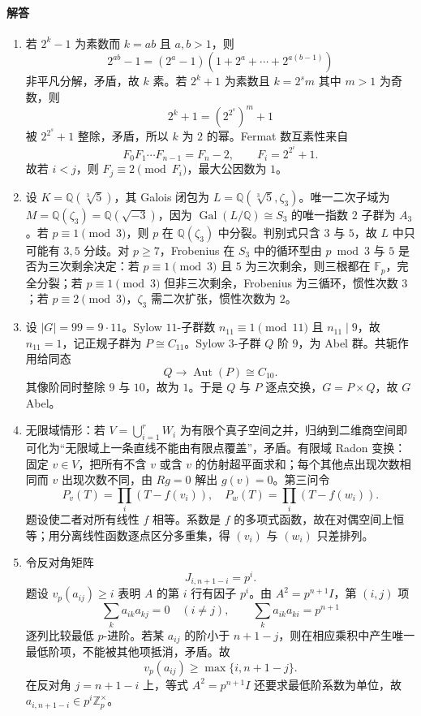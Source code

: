 \documentclass[UTF8,12pt]{ctexart}
\begin{document}
\paragraph{解答}
\begin{enumerate}[label=\textbf{\arabic*.},leftmargin=2.2em]
\item 若 \(2^k-1\) 为素数而 \(k=ab\) 且 \(a,b>1\)，则
\[
2^{ab}-1=(2^a-1)(1+2^a+\cdots+2^{a(b-1)})
\]
非平凡分解，矛盾，故 \(k\) 素。若 \(2^k+1\) 为素数且 \(k=2^s m\) 其中 \(m>1\) 为奇数，则
\[
2^k+1=(2^{2^s})^m+1
\]
被 \(2^{2^s}+1\) 整除，矛盾，所以 \(k\) 为 \(2\) 的幂。Fermat 数互素性来自
\[
F_0F_1\cdots F_{n-1}=F_n-2,\qquad F_i=2^{2^i}+1.
\]
故若 \(i<j\)，则 \(F_j\equiv2\pmod {F_i}\)，最大公因数为 \(1\)。
\item 设 \(K=\mathbb Q(\sqrt[3]{5})\)，其 Galois 闭包为 \(L=\mathbb Q(\sqrt[3]{5},\zeta_3)\)。唯一二次子域为 \(M=\mathbb Q(\zeta_3)=\mathbb Q(\sqrt{-3})\)，因为 \(\operatorname{Gal}(L/\mathbb Q)\cong S_3\) 的唯一指数 \(2\) 子群为 \(A_3\)。若 \(p\equiv1\pmod3\)，则 \(p\) 在 \(\mathbb Q(\zeta_3)\) 中分裂。判别式只含 \(3\) 与 \(5\)，故 \(L\) 中只可能有 \(3,5\) 分歧。对 \(p\ge7\)，Frobenius 在 \(S_3\) 中的循环型由 \(p\bmod3\) 与 \(5\) 是否为三次剩余决定：若 \(p\equiv1\pmod3\) 且 \(5\) 为三次剩余，则三根都在 \(\mathbb F_p\)，完全分裂；若 \(p\equiv1\pmod3\) 但非三次剩余，Frobenius 为三循环，惯性次数 \(3\)；若 \(p\equiv2\pmod3\)，\(\zeta_3\) 需二次扩张，惯性次数为 \(2\)。
\item 设 \(|G|=99=9\cdot 11\)。Sylow \(11\)-子群数 \(n_{11}\equiv1\pmod{11}\) 且 \(n_{11}\mid9\)，故 \(n_{11}=1\)，记正规子群为 \(P\cong C_{11}\)。Sylow \(3\)-子群 \(Q\) 阶 \(9\)，为 Abel 群。共轭作用给同态
\[
Q\to \operatorname{Aut}(P)\cong C_{10}.
\]
其像阶同时整除 \(9\) 与 \(10\)，故为 \(1\)。于是 \(Q\) 与 \(P\) 逐点交换，\(G=P\times Q\)，故 \(G\) Abel。
\item 无限域情形：若 \(V=\bigcup_{i=1}^r W_i\) 为有限个真子空间之并，归纳到二维商空间即可化为“无限域上一条直线不能由有限点覆盖”，矛盾。有限域 Radon 变换：固定 \(v\in V\)，把所有不含 \(v\) 或含 \(v\) 的仿射超平面求和；每个其他点出现次数相同而 \(v\) 出现次数不同，由 \(Rg=0\) 解出 \(g(v)=0\)。第三问令
\[
P_v(T)=\prod_i(T-f(v_i)),\quad P_w(T)=\prod_i(T-f(w_i)).
\]
题设使二者对所有线性 \(f\) 相等。系数是 \(f\) 的多项式函数，故在对偶空间上恒等；用分离线性函数逐点区分多重集，得 \((v_i)\) 与 \((w_i)\) 只差排列。
\item 令反对角矩阵
\[
J_{i,n+1-i}=p^i .
\]
题设 \(v_p(a_{ij})\ge i\) 表明 \(A\) 的第 \(i\) 行有因子 \(p^i\)。由 \(A^2=p^{n+1}I\)，第 \((i,j)\) 项
\[
\sum_k a_{ik}a_{kj}=0\quad(i\ne j),\qquad \sum_k a_{ik}a_{ki}=p^{n+1}
\]
逐列比较最低 \(p\)-进阶。若某 \(a_{ij}\) 的阶小于 \(n+1-j\)，则在相应乘积中产生唯一最低阶项，不能被其他项抵消，矛盾。故
\[
v_p(a_{ij})\ge\max\{i,n+1-j\}.
\]
在反对角 \(j=n+1-i\) 上，等式 \(A^2=p^{n+1}I\) 还要求最低阶系数为单位，故 \(a_{i,n+1-i}\in p^i\mathbb Z_p^\times\)。
\end{enumerate}
\end{document}
